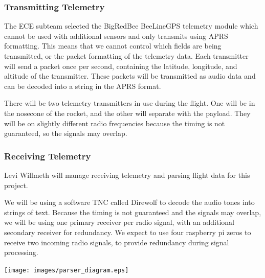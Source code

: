 \documentclass[onecolumn, draftclsnofoot, 10pt, compsoc]{IEEEtran}
\begin{document}
\subsubsection{Transmitting Telemetry}

The ECE subteam selected the BigRedBee BeeLineGPS telemetry module which cannot be used with additional sensors and only transmits using APRS formatting.  This means that we cannot control which fields are being transmitted, or the packet formatting of the telemetry data.  Each transmitter will send a packet once per second, containing the latitude, longitude, and altitude of the transmitter.  These packets will be transmitted as audio data and can be decoded into a string in the APRS format.

There will be two telemetry transmitters in use during the flight.  One will be in the nosecone of the rocket, and the other will separate with the payload.  They will be on slightly different radio frequencies because the timing is not guaranteed, so the signals may overlap.

\subsubsection{Receiving Telemetry}
\label{subsec:telemetry}

Levi Willmeth will manage receiving telemetry and parsing flight data for this project.

We will be using a software TNC called Direwolf to decode the audio tones into strings of text.  Because the timing is not guaranteed and the signals may overlap, we will be using one primary receiver per radio signal, with an additional secondary receiver for redundancy.  We expect to use four raspberry pi zeros to receive two incoming radio signals, to provide redundancy during signal processing.

\begin{center}
	\texttt{[image: images/parser\_diagram.eps]}
    \label{flow-of-data}
\end{center}

\end{document}
